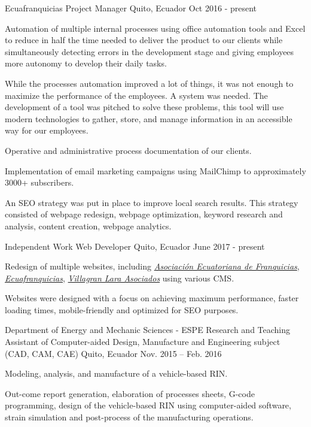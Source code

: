 
\begin{cventries}

  \cventry
    {Ecuafranquicias}
    {Project Manager}
    {Quito, Ecuador}
    {Oct 2016 - present}
    {
      \begin{cvitems}
        \item {Automation of multiple internal processes using oﬀice automation tools and Excel to reduce in half the time needed to deliver the product to our clients while simultaneously detecting errors in the development stage and giving employees more autonomy to develop their daily tasks.}
        \item {While the processes automation improved a lot of things, it was not enough to maximize the performance of the employees. A system was needed. The development of a tool was pitched to solve these problems, this tool will use modern technologies to gather, store, and manage information in an accessible way for our employees.}
        \item {Operative and administrative process documentation of our clients.}
        \item {Implementation of email marketing campaigns using MailChimp to approximately 3000+ subscribers.}
        \item {An SEO strategy was put in place to improve local search results. This strategy consisted of webpage redesign, webpage optimization, keyword research and analysis, content creation, webpage analytics.}
      \end{cvitems}
    }

    \cventry
      {Independent Work}
      {Web Developer}
      {Quito, Ecuador}
      {June 2017 - present}
      {
        \begin{cvitems}
          \item {Redesign of multiple websites, including \href{https://aefran.org}{\textit{Asociación Ecuatoriana de Franquicias}}, \href{http://www.ecuafranquicias.com}{\textit{Ecuafranquicias}}, \href{http://www.villagranlara.com}{\textit{Villagran Lara Asociados}} using various CMS.}
          \item {Websites were designed with a focus on achieving maximum performance, faster loading times, mobile-friendly and optimized for SEO purposes.}                       
        \end{cvitems} 
      }

  \cventry
    {Department of Energy and Mechanic Sciences - ESPE}
    {Research and Teaching Assistant of Computer-aided Design, Manufacture and Engineering subject (CAD, CAM, CAE)	}
    {Quito, Ecuador}
    {Nov. 2015 – Feb. 2016}
    {
      \begin{cvitems}
        \item {Modeling, analysis, and manufacture of a vehicle-based RIN.}
        \item {Out-come report generation, elaboration of processes sheets, G-code programming, design of the vehicle-based RIN using computer-aided software, strain simulation and post-process of the manufacturing operations.}
      \end{cvitems}
    }
  

\end{cventries}
